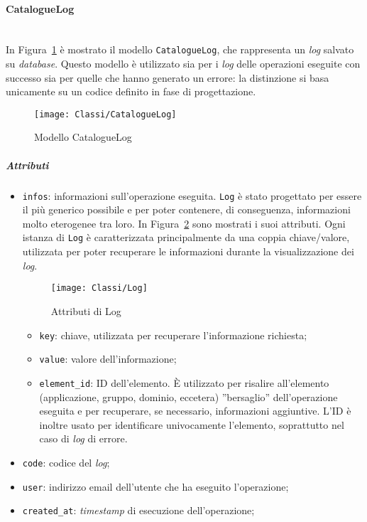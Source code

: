 \paragraph{CatalogueLog} \mbox{} \\
In Figura~\ref{fig:CatalogueLog} è mostrato il modello \texttt{CatalogueLog}, che rappresenta un \textit{log} salvato su \textit{database}. Questo modello è utilizzato sia per i \textit{log} delle operazioni eseguite con successo sia per quelle che hanno generato un errore: la distinzione si basa unicamente su un codice definito in fase di progettazione. 
\begin{figure}[h]
  \begin{center}
    \texttt{[image: Classi/CatalogueLog]}
  \caption[Modello CatalogueLog]{Modello CatalogueLog}
  \label{fig:CatalogueLog}
  \end{center} 
\end{figure}
\subparagraph{Attributi}
\begin{itemize}
\item \texttt{infos}: informazioni sull'operazione eseguita. \texttt{Log} è stato progettato per essere il più generico possibile e per poter contenere, di conseguenza, informazioni molto eterogenee tra loro. In Figura~\ref{fig:Log} sono mostrati i suoi attributi. Ogni istanza di \texttt{Log} è caratterizzata principalmente da una coppia chiave/valore, utilizzata per poter recuperare le informazioni durante la visualizzazione dei \textit{log}.
	\begin{figure}[hbpc]
	\begin{center}
  		\texttt{[image: Classi/Log]}
 		\caption[Attributi di Log]{Attributi di Log}
 		\label{fig:Log}
 	\end{center} 
	\end{figure}
	\begin{itemize}
		\item \texttt{key}: chiave, utilizzata per recuperare l'informazione richiesta;
		\item \texttt{value}: valore dell'informazione;
		\item \texttt{element\_id}: ID dell'elemento. È utilizzato per risalire all'elemento (applicazione, gruppo, dominio, eccetera) ''bersaglio'' dell'operazione eseguita e per recuperare, se necessario, informazioni aggiuntive. L'ID è inoltre usato per identificare univocamente l'elemento, soprattutto nel caso di \textit{log} di errore.
	\end{itemize}
\item \texttt{code}: codice del \textit{log};
\item \texttt{user}: indirizzo email dell'utente che ha eseguito l'operazione;
\item \texttt{created\_at}: \textit{timestamp} di esecuzione dell'operazione;
\end{itemize}
